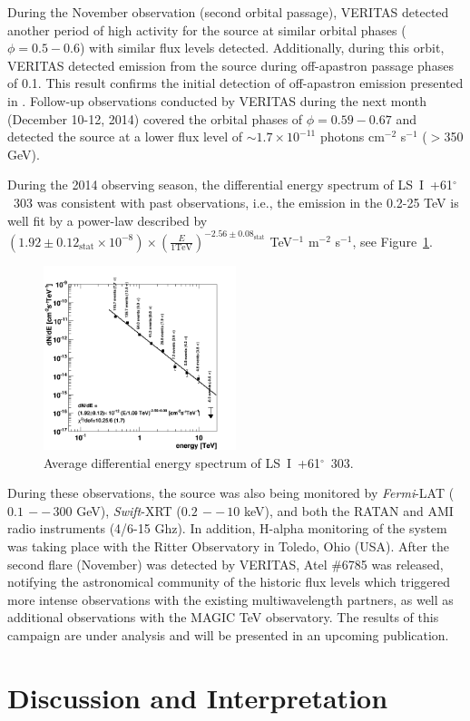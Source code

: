 \documentclass[preprint2]{aastex}
\newcommand{\pflux}{photons cm$^{-2}$ s$^{-1}$}
\newcommand{\lsi}{LS~I~+61$^{\circ}$~303}
\begin{document}
During the November observation (second orbital passage), VERITAS detected another period of high activity for the source at similar orbital phases ($\phi = 0.5-0.6$) with similar flux levels detected. Additionally, during this orbit, VERITAS detected emission from the source during off-apastron passage phases of 0.1. This result confirms the initial detection of off-apastron emission presented in \citep{2011ApJ...738....3A}. Follow-up observations conducted by VERITAS during the next month (December 10-12, 2014) covered the orbital phases of $\phi=0.59-0.67$ and detected the source at a lower flux level of $\sim1.7\times10^{-11}$ \pflux{} ($>$350 GeV).

During the 2014 observing season, the differential energy spectrum of \lsi{} was consistent with past observations, i.e., the emission in the 0.2-25 TeV is well fit by a power-law described by $\left( 1.92 \pm 0.12_{\mathrm{stat}} \times 10^{-8} \right) \times \left( \frac{E}{\mathrm{1 TeV}} \right)^{-2.56 \pm 0.08_{\mathrm{stat}}}$ TeV$^{-1}$ m$^{-2}$ s$^{-1}$, see Figure~\ref{spec}.

\begin{figure}
\centering
\includegraphics[width=0.5\textwidth]{figs/LSI-mod-replot-spec.png}
\caption{Average differential energy spectrum of \lsi{}.}
\label{spec}
\end{figure}

During these observations, the source was also being monitored by \emph{Fermi}-LAT ($0.1\,--\,300$ GeV), \emph{Swift}-XRT ($0.2\,--\,10$ keV), and both the RATAN and AMI radio instruments (4/6-15 Ghz). In addition, H-alpha monitoring of the system was taking place with the Ritter Observatory in Toledo, Ohio (USA). After the second flare (November) was detected by VERITAS, Atel $\#$6785 was released, notifying the astronomical community of the historic flux levels which triggered more intense observations with the existing multiwavelength partners, as well as additional observations with the MAGIC TeV observatory. The results of this campaign are under analysis and will be presented in an upcoming publication. 


\section{Discussion and Interpretation}





\end{document}
